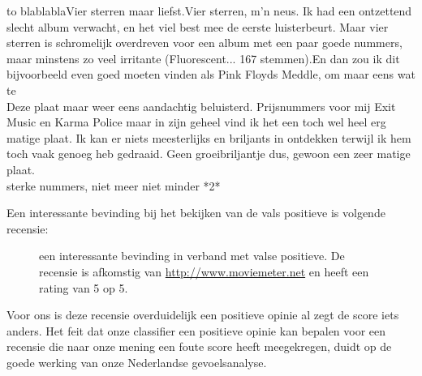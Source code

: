 \begin{table}[h]
\centering
\begin{tabu} to \textwidth {|X|}
\hline
blablablaVier sterren maar liefst.Vier sterren, m'n neus. Ik had een ontzettend slecht album verwacht, en het viel best mee de eerste luisterbeurt. Maar vier sterren is schromelijk overdreven voor een album met een paar goede nummers, maar minstens zo veel irritante (Fluorescent... 167 stemmen).En dan zou ik dit bijvoorbeeld even goed moeten vinden als Pink Floyds Meddle, om maar eens wat te \\ \hline
Deze plaat maar weer eens aandachtig beluisterd. Prijsnummers voor mij Exit Music en Karma Police maar in zijn geheel vind ik het een toch wel heel erg matige plaat. Ik kan er niets meesterlijks en briljants in ontdekken terwijl ik hem toch vaak genoeg heb gedraaid. Geen groeibriljantje dus, gewoon een zeer matige plaat.                                                                         \\  sterke nummers, niet meer niet minder *2*                                                                                                                                                                                                                                                                                                                                                                \\ \hline
\end{tabu}
\caption{Enkele vals positieve uit de muziekdataset}
\end{table}

Een interessante bevinding bij het bekijken van de vals positieve is volgende recensie:

\begin{figure}[h]%
    \centering
    \caption{een interessante bevinding in verband met valse positieve. De recensie is afkomstig van \url{http://www.moviemeter.net} en heeft een rating van 5 op 5. }
\end{figure}

Voor ons is deze recensie overduidelijk een positieve opinie al zegt de score iets anders. Het feit dat onze classifier een positieve opinie kan bepalen voor een recensie die naar onze mening een foute score heeft meegekregen, duidt op de goede werking van onze Nederlandse gevoelsanalyse.


